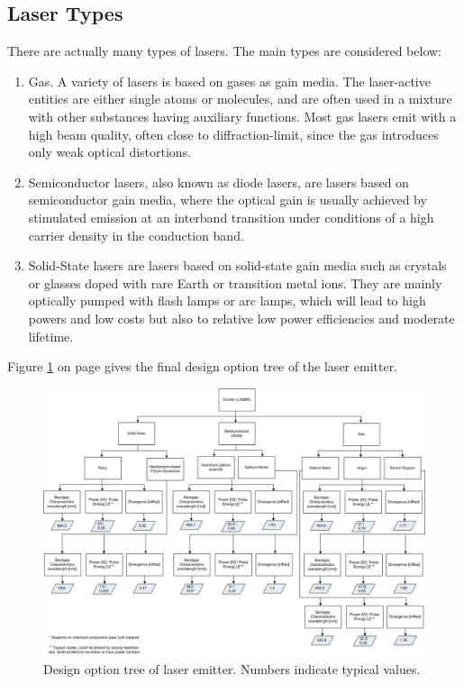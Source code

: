\subsection{Laser Types}
	\label{blDOLSRtypes}
There are actually many types of \acs{laser}s. The main types are considered below:
\begin{enumerate}
	\item Gas. A variety of \acs{laser}s is based on gases as gain media. The \acs{laser}-active entities are either single atoms or molecules, and are often used in a mixture with other substances having auxiliary functions. Most gas lasers emit with a high beam quality, often close to diffraction-limit, since the gas introduces only weak optical distortions.
	\item Semiconductor \acs{laser}s, also known as diode \acs{laser}s, are \acs{laser}s based on semiconductor gain media, where the optical gain is usually achieved by stimulated emission at an interband transition under conditions of a high carrier density in the conduction band.  
	\item Solid-State \acs{laser}s are \acs{laser}s based on solid-state gain media such as crystals or glasses doped with rare Earth or transition metal ions. They are mainly optically pumped with flash lamps or arc lamps, which will lead to high powers and low costs but also to relative low power efficiencies and moderate lifetime. \cite{lasertech}
\end{enumerate} 
Figure \ref{DOS_laser} on page \pageref{DOS_laser} gives the final design option tree of the laser emitter.

\begin{figure} [!ht]
	\centering
	\includegraphics[height=0.85\textwidth,angle=90]{chapters/img/DOStree_laser.jpg}	
	\caption{Design option tree of laser emitter. Numbers indicate typical values.}
	\label{DOS_laser}
\end{figure}
